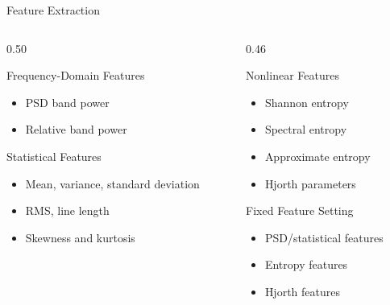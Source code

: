 \documentclass[10pt,aspectratio=169]{beamer}
\begin{document}
\begin{frame}{Feature Extraction}
  \begin{columns}
    \begin{column}{0.50\textwidth}
      \begin{block}{Frequency-Domain Features}
        \begin{itemize}
          \item PSD band power
          \item Relative band power
        \end{itemize}
      \end{block}

      \begin{block}{Statistical Features}
        \begin{itemize}
          \item Mean, variance, standard deviation
          \item RMS, line length
          \item Skewness and kurtosis
        \end{itemize}
      \end{block}
    \end{column}

    \begin{column}{0.46\textwidth}
      \begin{block}{Nonlinear Features}
        \begin{itemize}
          \item Shannon entropy
          \item Spectral entropy
          \item Approximate entropy
          \item Hjorth parameters
        \end{itemize}
      \end{block}

      \begin{block}{Fixed Feature Setting}
        \begin{itemize}
          \item PSD/statistical features
          \item Entropy features
          \item Hjorth features
        \end{itemize}
      \end{block}
    \end{column}
  \end{columns}
\end{frame}
\end{document}
